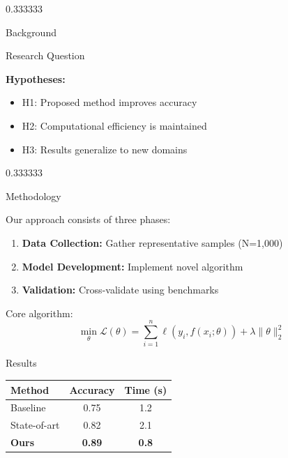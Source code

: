 \documentclass[final,xcolor={table}]{beamer}
\begin{document}
\begin{frame}[t]
\begin{postergrid}[3]
\begin{postergridcolumn}{0.333333}
\begin{block}{Background}
\end{block}

\begin{alertblock}{Research Question}

\textbf{Hypotheses:}
\begin{itemize}
  \item H1: Proposed method improves accuracy
  \item H2: Computational efficiency is maintained
  \item H3: Results generalize to new domains
\end{itemize}

\end{alertblock}

\end{postergridcolumn}

\begin{postergridcolumn}{0.333333}

\begin{block}{Methodology}

Our approach consists of three phases:

\begin{enumerate}
  \item \textbf{Data Collection:} Gather representative samples (N=1,000)
  \item \textbf{Model Development:} Implement novel algorithm
  \item \textbf{Validation:} Cross-validate using benchmarks
\end{enumerate}

Core algorithm:
\[
\min_{\theta} \mathcal{L}(\theta) = \sum_{i=1}^{n} \ell(y_i, f(x_i; \theta)) + \lambda \|\theta\|_2^2
\]

\end{block}

\begin{block}{Results}

\begin{center}
\begin{tabular}{lcc}
\toprule
\textbf{Method} & \textbf{Accuracy} & \textbf{Time (s)} \\
\midrule
Baseline & 0.75 & 1.2 \\
State-of-art & 0.82 & 2.1 \\
\rowcolor{IULightCream}
\textbf{Ours} & \textbf{0.89} & \textbf{0.8} \\
\bottomrule
\end{tabular}
\end{center}


\end{block}
\end{postergridcolumn}
\end{postergrid}
\end{frame}
\end{document}
